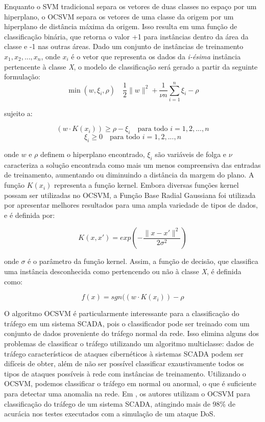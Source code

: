 \documentclass[cic,tc]{iiufrgs}
\begin{document}
Enquanto o SVM tradicional separa os vetores de duas classes no espaço por um hiperplano, o OCSVM separa os vetores de uma classe da origem por um hiperplano de distância máxima da origem. Isso resulta em uma função de classificação binária, que retorna o valor +1 para instâncias dentro da área da classe e -1 nas outras áreas. Dado um conjunto de instâncias de treinamento \(x_1,x_2,...,x_n\), onde \(x_i\) é o vetor que representa os dados da \emph{i-ésima} instância pertencente à classe \emph{X}, o modelo de classificação será gerado a partir da seguinte formulação:
\begin{displaymath}
\min (w,\xi_i,\rho) \quad \frac{1}{2} \|w\|^2 + \frac{1}{\nu n} \sum_{i=1}^{n} \xi_i - \rho
\end{displaymath}

sujeito a:

\begin{displaymath}
(w \cdot K(x_i)) \geq \rho - \xi_i \quad	\text{para todo } i = 1,2,...,n
\end{displaymath}
\begin{displaymath}
\xi_i \geq 0	\quad \text{para todo } i = 1,2,...,n
\end{displaymath}

onde $w$ e $\rho$ definem o hiperplano encontrado, $\xi_i$ são variáveis de folga e $\nu$ caracteriza a solução encontrada como mais um menos compreensiva das entradas de treinamento, aumentando ou diminuindo a distância da margem do plano. A função $K(x_i)$ representa a função kernel. Embora diversas funções kernel possam ser utilizadas no OCSVM, a Função Base Radial Gaussiana foi utilizada por apresentar melhores resultados para uma ampla variedade de tipos de dados, e é definida por:

\begin{displaymath}
K(x,x') = exp (- \frac{\| x - x' \| ^2}{2 \sigma ^2})
\end{displaymath}

onde $\sigma$ é o parâmetro da função kernel. Assim, a função de decisão, que classifica uma instância desconhecida como pertencendo ou não à classe \emph{X}, é definida como:

\begin{displaymath}
f(x) = sgn((w \cdot K(x_i)) - \rho
\end{displaymath}

O algoritmo OCSVM é particularmente interessante para a classificação do tráfego em um sistema SCADA, pois o classificador pode ser treinado com um conjunto de dados proveniente do tráfego normal da rede. Isso elimina alguns dos problemas de classificar o tráfego utilizando um algoritmo multiclasse: dados de tráfego característicos de ataques cibernéticos à sistemas SCADA podem ser difíceis de obter, além de não ser possível classificar exaustivamente todos os tipos de ataques possíveis à rede com instâncias de treinamento. Utilizando o OCSVM, podemos classificar o tráfego em normal ou anormal, o que é suficiente para detectar uma anomalia na rede. Em \cite{germano2015ocnids}, os autores utilizam o OCSVM para classificação do tráfego de um sistema SCADA, atingindo mais de 98\% de acurácia nos testes executados com a simulação de um ataque DoS.
\end{document}
